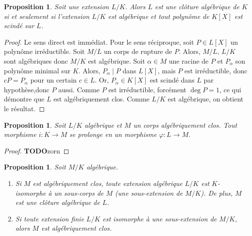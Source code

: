 \documentclass{article}
\newcommand{\todo}{\textbf{TODO}}
\theoremstyle{plain}
\newtheorem{proposition}[theorem]{Proposition}
\theoremstyle{definition}
\theoremstyle{remark}
\begin{document}
\begin{proposition} \label{propclotalgpolscinde}
    Soit une extension $L/K$. Alors $L$ est une clôture algébrique de $K$ si et seulement si l'extension $L/K$ est algébrique et tout polynôme de $K[X]$ est scindé sur $L$.
\end{proposition}

\begin{proof}
    Le sens direct est immédiat. Pour le sens réciproque, soit $P \in L[X]$ un polynôme irréductible. Soit $M/L$ un corps de rupture de $P$. Alors, $M/L$, $L/K$ sont algébriques donc $M/K$ est algébrique. Soit $\alpha \in M$ une racine de $P$ et $P_\alpha$ son polynôme minimal sur $K$. Alors, $P_\alpha \mid P$ dans $L[X]$, mais $P$ est irréductible, donc $c P = P_\alpha$ pour un certain $c\in L$. Or, $P_\alpha \in K[X]$ est scindé dans $L$ par hypothèse,donc $P$ aussi. Comme $P$ est irréductible, forcément $\deg P = 1$, ce qui démontre que $L$ est algébriquement clos. Comme $L/K$ est algébrique, on obtient le résultat.
\end{proof}

\begin{proposition} \label{prolongmorcac}
    Soit $L/K$ algébrique et $M$ un corps algébriquement clos. Tout morphisme $i : K \to M$ se prolonge en un morphisme $\varphi : L \to M$.
    \begin{center}
    \end{center}
\end{proposition}

\begin{proof}
    \todo zorn
\end{proof}

\begin{proposition}
    Soit $M/K$ algébrique.
    \begin{enumerate}
        \item Si $M$ est algébriquement clos, toute extension algébrique $L/K$ est $K$-isomorphe à un sous-corps de $M$ (une sous-extension de $M/K$). De plus, $M$ est une clôture algébrique de $L$.
        \item Si toute extension finie $L/K$ est isomorphe à une sous-extension de $M/K$, alors $M$ est algébriquement clos.
    \end{enumerate}
\end{proposition}
\end{document}
